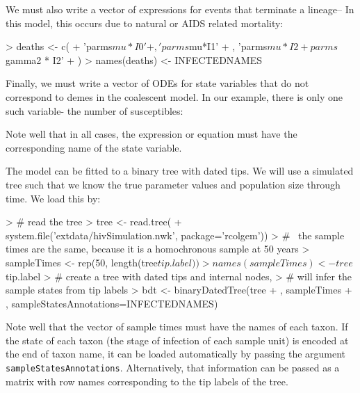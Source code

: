 \documentclass{article}
\begin{document}
We must also write a vector of expressions for events that terminate a lineage-- In this model, this occurs due to natural or AIDS related mortality: 
\begin{Schunk}
\begin{Sinput}
> deaths <- c(
+  'parms$mu*I0'
+  , 'parms$mu*I1'
+  , 'parms$mu*I2 + parms$gamma2 * I2'
+ )
> names(deaths) <- INFECTEDNAMES
\end{Sinput}
\end{Schunk}

Finally, we must write a vector of ODEs for state variables that do not correspond to demes in the coalescent model. 
In our example, there is only one such variable- the number of susceptibles: 
\begin{Schunk}
\end{Schunk}
Note well that in all cases, the expression or equation must have the corresponding name of the state variable. 

The model can be fitted to a binary tree with dated tips. 
We will use a simulated tree such that we know the true parameter values and population size through time. 
We load this by: 
\begin{Schunk}
\begin{Sinput}
> # read the tree
> tree <- read.tree(
+    system.file('extdata/hivSimulation.nwk', package='rcolgem'))
> #~ the sample times are the same, because it is a homochronous sample at 50 years
> sampleTimes <- rep(50, length(tree$tip.label))
> names(sampleTimes) <- tree$tip.label
> # create a tree with dated tips and internal nodes, 
> # will infer the sample states from tip labels
> bdt <- binaryDatedTree(tree
+   , sampleTimes
+   , sampleStatesAnnotations=INFECTEDNAMES)
\end{Sinput}
\end{Schunk}
Note well that the vector of sample times must have the names of each taxon. 
If the state of each taxon (the stage of infection of each sample unit) is encoded at the end of taxon name, it can be loaded automatically by passing the argument \texttt{sampleStatesAnnotations}.  
Alternatively, that information can be passed as a matrix with row names corresponding to the tip labels of the tree. 
\end{document}
